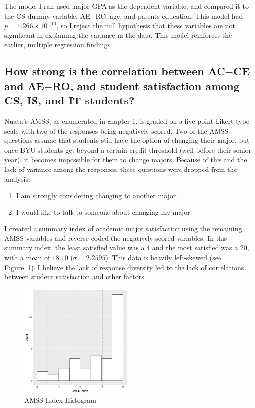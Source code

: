The model I ran used major GPA as the dependent variable, and compared it to the CS dummy variable, AE$-$RO, age, and parents education. This model had $p=1.266\times 10^{-10}$, so I reject the null hypothesis that these variables are not significant in explaining the variance in the data. This model reinforces the earlier, multiple regression findings.

\subsection{How strong is the correlation between AC$-$CE and AE$-$RO, and student satisfaction among CS, IS, and IT students?}
Nuata's AMSS, as enumerated in chapter 1, is graded on a five-point Likert-type scale with two of the responses being negatively scored. Two of the AMSS questions assume that students still have the option of changing their major, but once BYU students get beyond a certain credit threshold (well before their senior year), it becomes impossible for them to change majors. Because of this and the lack of variance among the responses, these questions were dropped from the analysis:
\begin{enumerate}
  \item I am strongly considering changing to another major.
  \item I would like to talk to someone about changing my major.
\end{enumerate}

I created a summary index of academic major satisfaction using the remaining AMSS variables and reverse coded the negatively-scored variables. In this summary index, the least satisfied value was a 4 and the most satisfied was a 20, with a mean of $18.10$ ($\sigma=2.2595$). This data is heavily left-skewed (see Figure~\ref{fig:c-amss_index_plot}). I believe the lack of response diversity led to the lack of correlations between student satisfaction and other factors.

\begin{figure}[!hbtp]
  \centering
  \includegraphics[width=0.5\textwidth]{figures/chapter4/amss_index_plot.jpg}
  \caption{AMSS Index Histogram}
  \label{fig:c-amss_index_plot}
\end{figure}

